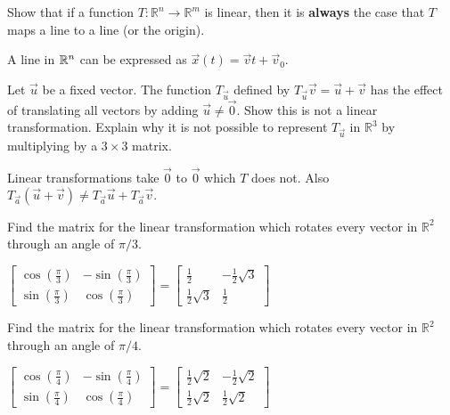 \documentclass{ximera}
\begin{document}
\begin{problem}\label{prb:linesToLines} Show that if a function $T:\mathbb{R}^{n}\rightarrow \mathbb{R}^{m}$
is linear, then it is \textbf{always }the case that $T$ maps a line to a line (or the origin).
\begin{hint}
A line in $\mathbb{R}^n$ can be expressed as $\vec{x}(t)=\vec{v}t+\vec{v}_0$.
\end{hint}
\end{problem}

\begin{problem}\label{prb:6.3} Let $\vec{u}$ be a fixed vector. The function
$T_{\vec{u}}$ defined by $T_{\vec{u}}\vec{v}=\vec{u}+\vec{v}$ has the effect of
translating all vectors by adding $\vec{u}\neq \vec{0}$. Show this is not a
linear transformation. Explain why it is not possible to represent
$T_{\vec{u}}$ in $\mathbb{R}^{3}$ by multiplying by a $3\times 3$ matrix.
\begin{hint}
Linear
transformations take $\vec{0}$ to $\vec{0}$ which $T$ does not. Also $T_{\vec{a}}\left( \vec{u}+\vec{v}\right) \neq T_{\vec{a}}\vec{u}+T_{\vec{a}}
\vec{v}.$
\end{hint}
\end{problem}

\begin{problem}\label{prb:6.11}  Find the matrix for the linear transformation which
rotates every vector in $\mathbb{R}^{2}$ through an angle of $\pi /3.$
\begin{hint}
$\left[
\begin{array}{cc}
\cos \left(
\frac{\pi }{3}\right) & -\sin \left( \frac{\pi }{3}\right) \\
\sin \left( \frac{\pi }{3}\right) & \cos \left( \frac{\pi }{3}\right)%
\end{array}
\right] = \left[
\begin{array}{cc}
\frac{1}{2} & -\frac{1}{2}\sqrt{3} \\
\frac{1}{2}\sqrt{3} & \frac{1}{2}
\end{array}
\right] $
\end{hint}
\end{problem}


\begin{problem}\label{prb:6.12} Find the matrix for the linear transformation which rotates every
vector in $\mathbb{R}^{2}$ through an angle of $\pi /4.$
\begin{hint}
$\left[
\begin{array}{cc}
\cos \left( \frac{\pi }{4}\right) & -\sin \left( \frac{\pi }{4}\right) \\
\sin \left( \frac{\pi }{4}\right) & \cos \left( \frac{\pi }{4}\right)
\end{array}
\right] = \left[
\begin{array}{cc}
\frac{1}{2}\sqrt{2} & -\frac{1}{2}\sqrt{2} \\
\frac{1}{2}\sqrt{2} & \frac{1}{2}\sqrt{2}
\end{array}
\right] $
\end{hint}
\end{problem}
\end{document}
